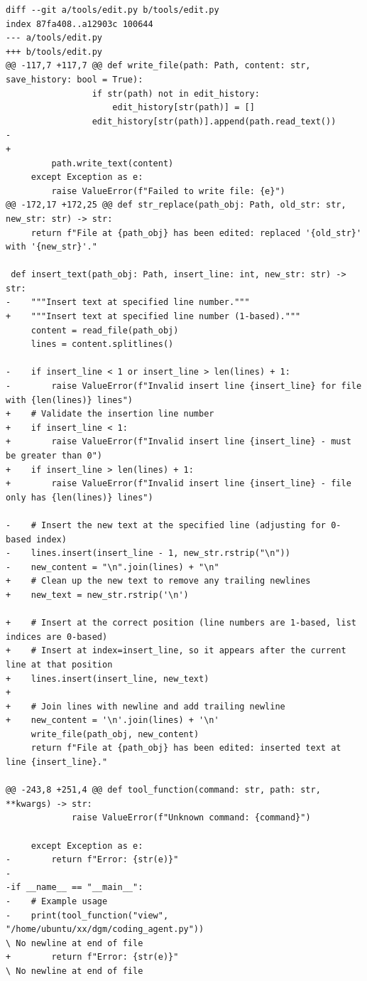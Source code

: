 \documentclass{article}
\begin{document}
\begin{lstlisting}[style=diffstyle]
diff --git a/tools/edit.py b/tools/edit.py
index 87fa408..a12903c 100644
--- a/tools/edit.py
+++ b/tools/edit.py
@@ -117,7 +117,7 @@ def write_file(path: Path, content: str, save_history: bool = True):
                 if str(path) not in edit_history:
                     edit_history[str(path)] = []
                 edit_history[str(path)].append(path.read_text())
-
+        
         path.write_text(content)
     except Exception as e:
         raise ValueError(f"Failed to write file: {e}")
@@ -172,17 +172,25 @@ def str_replace(path_obj: Path, old_str: str, new_str: str) -> str:
     return f"File at {path_obj} has been edited: replaced '{old_str}' with '{new_str}'."
 
 def insert_text(path_obj: Path, insert_line: int, new_str: str) -> str:
-    """Insert text at specified line number."""
+    """Insert text at specified line number (1-based)."""
     content = read_file(path_obj)
     lines = content.splitlines()
 
-    if insert_line < 1 or insert_line > len(lines) + 1:
-        raise ValueError(f"Invalid insert line {insert_line} for file with {len(lines)} lines")
+    # Validate the insertion line number
+    if insert_line < 1:
+        raise ValueError(f"Invalid insert line {insert_line} - must be greater than 0")
+    if insert_line > len(lines) + 1:
+        raise ValueError(f"Invalid insert line {insert_line} - file only has {len(lines)} lines")
 
-    # Insert the new text at the specified line (adjusting for 0-based index)
-    lines.insert(insert_line - 1, new_str.rstrip("\n"))
-    new_content = "\n".join(lines) + "\n"
+    # Clean up the new text to remove any trailing newlines
+    new_text = new_str.rstrip('\n')
     
+    # Insert at the correct position (line numbers are 1-based, list indices are 0-based)
+    # Insert at index=insert_line, so it appears after the current line at that position
+    lines.insert(insert_line, new_text)
+
+    # Join lines with newline and add trailing newline
+    new_content = '\n'.join(lines) + '\n'
     write_file(path_obj, new_content)
     return f"File at {path_obj} has been edited: inserted text at line {insert_line}."
 
@@ -243,8 +251,4 @@ def tool_function(command: str, path: str, **kwargs) -> str:
             raise ValueError(f"Unknown command: {command}")
 
     except Exception as e:
-        return f"Error: {str(e)}"
-
-if __name__ == "__main__":
-    # Example usage
-    print(tool_function("view", "/home/ubuntu/xx/dgm/coding_agent.py"))
\ No newline at end of file
+        return f"Error: {str(e)}"
\ No newline at end of file
\end{lstlisting}
\end{document}

